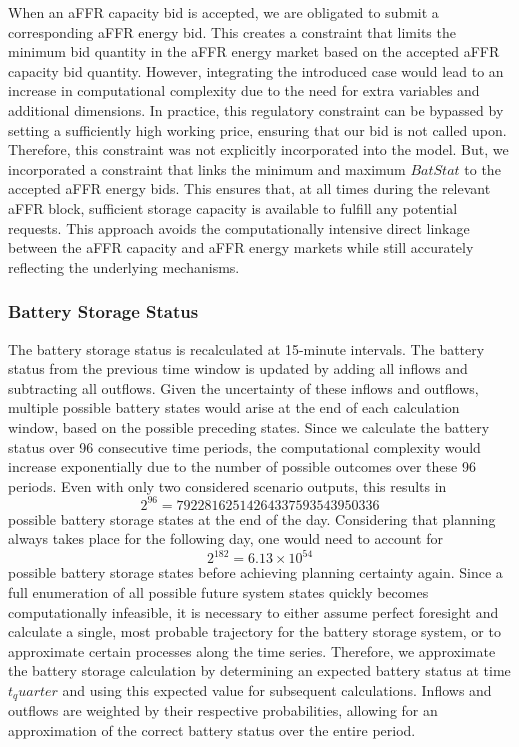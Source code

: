 When an aFFR capacity bid is accepted, we are obligated to submit a corresponding aFFR energy bid.
This creates a constraint that limits the minimum bid quantity in the aFFR energy market based on the accepted aFFR capacity bid quantity.
However, integrating the introduced case would lead to an increase in computational complexity due to the need for extra variables and additional
dimensions. In practice, this regulatory constraint can be bypassed by setting a sufficiently high working price, ensuring that our bid is not called upon.
Therefore, this constraint was not explicitly incorporated into the model.
But, we incorporated a constraint that links the minimum and maximum $BatStat$ to the accepted aFFR energy bids.
This ensures that, at all times during the relevant aFFR block, sufficient storage capacity is available to fulfill any potential requests.
This approach avoids the computationally intensive direct linkage between the aFFR capacity and aFFR energy markets while still
accurately reflecting the underlying mechanisms.

\subsubsection{Battery Storage Status}



The battery storage status is recalculated at 15-minute intervals.
The battery status from the previous time window is updated by adding all inflows and subtracting all outflows.
Given the uncertainty of these inflows and outflows, multiple possible battery states would arise at the end of each calculation window, based on the possible preceding states.
Since we calculate the battery status over 96 consecutive time periods, the computational complexity would increase exponentially due to the number of possible outcomes over these 96 periods.
Even with only two considered scenario outputs, this results in
\[
	2^{96} = 79228162514264337593543950336
\]
possible battery storage states at the end of the day.
Considering that planning always takes place for the following day,
one would need to account for
\[
	2^{182} = 6.13 \times 10^{54}
\]
possible battery storage states before achieving planning certainty again.
Since a full enumeration of all possible future system states quickly becomes computationally infeasible,
it is necessary to either assume perfect foresight and calculate a single, most probable trajectory
for the battery storage system, or to approximate certain processes along the time series.
Therefore, we approximate the battery storage calculation by determining an expected battery status at time $t_quarter$ and using this expected value for subsequent calculations.
Inflows and outflows are weighted by their respective probabilities, allowing for an approximation of the correct battery status over the entire period.

